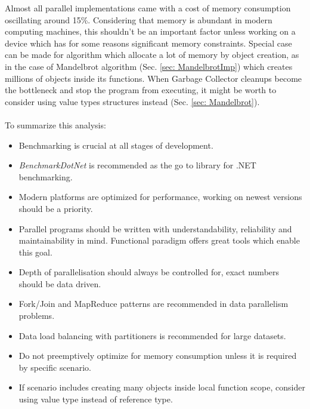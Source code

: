 Almost all parallel implementations came with a cost of memory consumption oscillating around 15\%. Considering that memory is abundant in modern computing machines, this shouldn't be an important factor unless working on a device which has for some reasons significant memory constraints. Special case can be made for algorithm which allocate a lot of memory by object creation, as in the case of Mandelbrot algorithm (Sec. \ref{sec: MandelbrotImp}) which creates millions of objects inside its functions. When Garbage Collector cleanups become the bottleneck and stop the program from executing, it might be worth to consider using value types structures instead (Sec. \ref{sec: Mandelbrot}).
\\ \\
To summarize this analysis: 
\begin{itemize}
	\item Benchmarking is crucial at all stages of development.
	\item \emph{BenchmarkDotNet} is recommended as the go to library for .NET benchmarking.
	\item Modern platforms are optimized for performance, working on newest versions should be a priority.
	\item Parallel programs should be written with understandability, reliability and maintainability in mind. Functional paradigm offers great tools which enable this goal.
	\item Depth of parallelisation should always be controlled for, exact numbers should be data driven.
	\item Fork/Join and MapReduce patterns are recommended in data parallelism problems. 
	\item Data load balancing with partitioners is recommended for large datasets.
	\item Do not preemptively optimize for memory consumption unless it is required by specific scenario.
	\item If scenario includes creating many objects inside local function scope, consider using value type instead of reference type.

\end{itemize}
